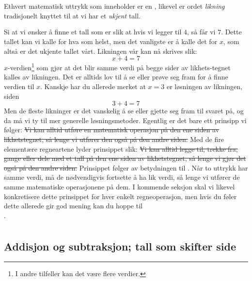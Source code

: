 





\section{\ligintro}
Ethvert matematisk uttrykk som inneholder \sym{$=$} er en , likevel er ordet \textit{likning} tradisjonelt knyttet til at vi har et \textsl{ukjent} tall.\vsk

Si at vi ønsker å finne et tall som er slik at hvis vi legger til $4$, så får vi $7$. Dette tallet kan vi kalle for hva som helst, men det vanligste er å kalle det for $ x $, som altså er det ukjente tallet vårt. Likningen vår kan nå skrives slik:
\[ x+4=7 \]
$ x $-verdien\footnote{I andre tilfeller kan det være flere verdier.} som gjør at det blir samme verdi på begge sider av likhets-tegnet kalles  av likningen.
Det er alltids lov til å se eller prøve seg fram for å finne verdien til $ x $. Kanskje har du allerede merket at $ {x=3} $ er løsningen av likningen, siden
\[ 3+4=7 \]
Men de fleste likninger er det vanskelig å se eller gjette seg fram til svaret på, og da må vi ty til mer generelle løsningsmetoder. Egentlig er det bare ett prinsipp vi følger:
\st{\label{principle}Vi kan alltid utføre en matematisk operasjon på den ene siden av likhetstegnet, så lenge vi utfører den også på den andre siden.}
Med de fire elementære regneartene lyder prinsippet slik:
\st{Vi kan alltid legge til, trekke fra, gange eller dele med et tall på den ene siden av likhetstegnet, så lenge vi gjør det også på den andre siden.}\regv
Prinsippet følger av betydningen til \sym{$=$}. Når to uttrykk har samme verdi, må de nødvendigvis fortsette å ha lik verdi, så lenge vi utfører de samme matematiske operasjonene på dem. I kommende seksjon skal vi likevel konkretisere dette prinsippet for hver enkelt regneoperasjon, men hvis du føler dette allerede gir god mening kan du hoppe til\\ .
\section{\liglos \label{likloysfire}}
\subsection*{Addisjon og subtraksjon; tall som skifter side}
